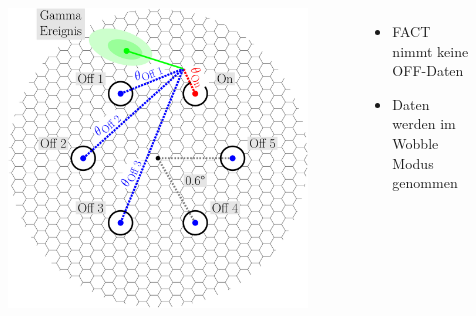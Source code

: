 \documentclass[aspectratio=1610, professionalfonts, 9pt]{beamer}
\begin{document}
\begin{frame}
  \begin{columns}
	\begin{figure}
	  \centering
	  \includegraphics[height=0.8\textheight]{./images/wobble.pdf}
	\end{figure}
	\begin{itemize}
		\item FACT nimmt keine OFF-Daten
		\item Daten werden im Wobble Modus genommen
	\end{itemize}
  \end{columns}
\end{frame}
\end{document}

